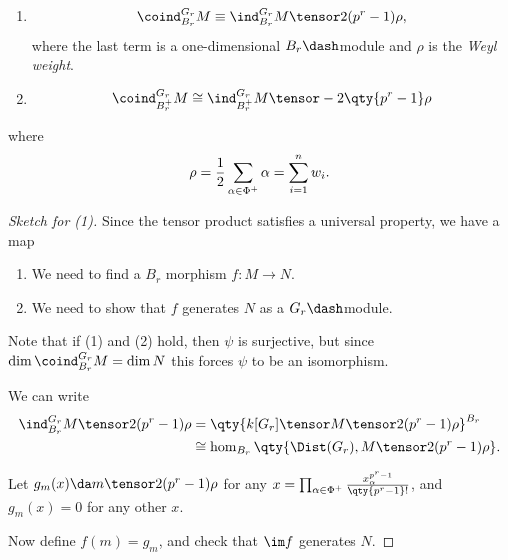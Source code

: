 \begin{proposition}[?]

\hfill

\begin{enumerate}
\def\labelenumi{\arabic{enumi}.}
\item

  \begin{align*}\coind_{B_r}^{G_r} M \equiv \ind_{B_r}^{G_r} M\tensor 2(p^r - 1)\rho,\end{align*}
  where the last term is a one-dimensional \(B_r\dash\)module and
  \(\rho\) is the \emph{Weyl weight}.
\item

  \begin{align*}\coind_{B_r^+}^{G_r} M \cong \ind_{B_r^+}^{G_r} M \tensor -2\qty{p^r-1}\rho\end{align*}
\end{enumerate}

where
\begin{align*}  
\rho = {1\over 2}\sum_{\alpha\in\Phi^+} \alpha = \sum_{i=1}^n w_i
.\end{align*}

\end{proposition}

\begin{proof}[Sketch for (1)]

Since the tensor product satisfies a universal property, we have a map

\begin{center}
\end{center}

\begin{enumerate}
\def\labelenumi{\arabic{enumi}.}
\item
  We need to find a \(B_r\) morphism \(f:M\to N\).
\item
  We need to show that \(f\) generates \(N\) as a \(G_r\dash\)module.
\end{enumerate}

Note that if (1) and (2) hold, then \(\psi\) is surjective, but since
\(\dim \coind_{B_r}^{G_r} M= \dim N\) this forces \(\psi\) to be an
isomorphism.

We can write
\begin{align*}  
\ind_{B_r}^{G_r} M\tensor 2(p^r-1) \rho
&=
\qty{ k[G_r] \tensor M \tensor 2(p^r-1) \rho  }^{B_r} \\
&\cong
\hom_{B_r}\qty{\Dist(G_r), M\tensor 2(p^r-1)\rho }
.\end{align*}

Let \(g_m(x) \da m\tensor 2(p^r-1)\rho\) for any
\(x =\prod_{\alpha\in\Phi^+} {x_\alpha^{p^r-1} \over \qty{p^r-1}! }\),
and \(g_m(x) = 0\) for any other \(x\).

Now define \(f(m) = g_m\), and check that \(\im f\) generates \(N\).

\end{proof}

